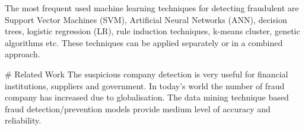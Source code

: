 The most frequent used machine learning techniques for detecting fraudulent are Support Vector Machines (SVM), Artificial Neural Networks (ANN), decision trees, logistic regression (LR), rule induction techniques, k-means cluster, genetic algorithms etc. These techniques can be applied separately or in a combined approach. 

# Related Work 
The suspicious company detection is very useful for financial institutions, suppliers and government. In today's world the number of fraud company has increased due to globalisation. The data mining technique based fraud detection/prevention models provide medium level of accuracy and reliability. 